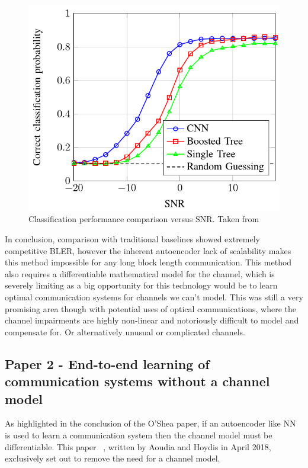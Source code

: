 \documentclass[12pt,onecolumn,letterpaper]{article}
\newcommand\genfigsize{0.5}
\begin{document}
\begin{figure}[t]
   \centering
   \includegraphics[width=\genfigsize\linewidth]{figures/oShea_CNN_Rx_classification.PNG}
   \caption{Classification performance comparison versus SNR. Taken from~\cite{oShea}}
\label{fig:oSheaCnnRxClassification}
\end{figure}

In conclusion, comparison with traditional baselines showed extremely competitive BLER, however the inherent autoencoder lack of scalability makes this method impossible for any long block length communication. This method also requires a differentiable mathematical model for the channel, which is severely limiting as a big opportunity for this technology would be to learn optimal communication systems for channels we can't model. This was still a very promising area though with potential uses of optical communications, where the channel impairments are highly non-linear and notoriously difficult to model and compensate for. Or alternatively unusual or complicated channels.

\FloatBarrier
\subsection{Paper 2 - End-to-end learning of communication systems without a channel model}

As highlighted in the conclusion of the O'Shea paper, if an autoencoder like NN is used to learn a communication system then the channel model must be  differentiable. This paper ~\cite{Aoudia}, written by Aoudia and Hoydis in April 2018, exclusively set out to remove the need for a channel model. 
\end{document}
